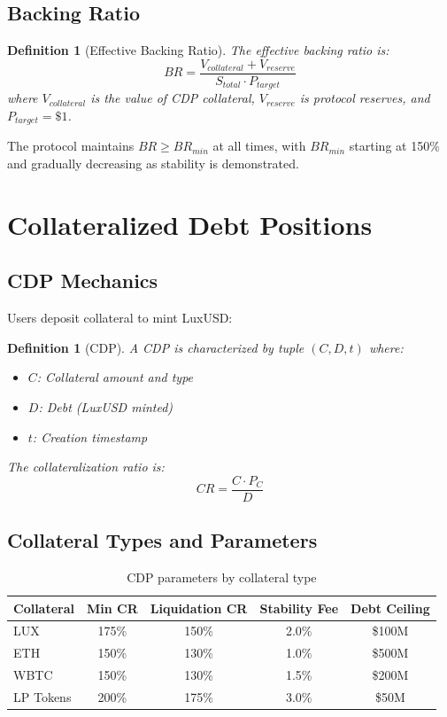 \documentclass[11pt,a4paper]{article}
\newtheorem{definition}[theorem]{Definition}
\begin{document}
\subsection{Backing Ratio}

\begin{definition}[Effective Backing Ratio]
The effective backing ratio is:
\begin{equation}
    BR = \frac{V_{collateral} + V_{reserve}}{S_{total} \cdot P_{target}}
\end{equation}
where $V_{collateral}$ is the value of CDP collateral, $V_{reserve}$ is protocol reserves, and $P_{target} = \$1$.
\end{definition}

The protocol maintains $BR \geq BR_{min}$ at all times, with $BR_{min}$ starting at 150\% and gradually decreasing as stability is demonstrated.

\section{Collateralized Debt Positions}

\subsection{CDP Mechanics}

Users deposit collateral to mint LuxUSD:

\begin{definition}[CDP]
A CDP is characterized by tuple $(C, D, t)$ where:
\begin{itemize}
    \item $C$: Collateral amount and type
    \item $D$: Debt (LuxUSD minted)
    \item $t$: Creation timestamp
\end{itemize}

The collateralization ratio is:
\begin{equation}
    CR = \frac{C \cdot P_C}{D}
\end{equation}
\end{definition}

\subsection{Collateral Types and Parameters}

\begin{table}[h]
\centering
\begin{tabular}{@{}lcccc@{}}
\toprule
Collateral & Min CR & Liquidation CR & Stability Fee & Debt Ceiling \\
\midrule
LUX & 175\% & 150\% & 2.0\% & \$100M \\
ETH & 150\% & 130\% & 1.0\% & \$500M \\
WBTC & 150\% & 130\% & 1.5\% & \$200M \\
LP Tokens & 200\% & 175\% & 3.0\% & \$50M \\
\bottomrule
\end{tabular}
\caption{CDP parameters by collateral type}
\label{tab:cdp_params}
\end{table}
\end{document}
